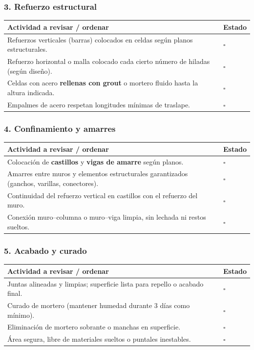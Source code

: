 \documentclass[12pt]{article}
\newcommand{\cbox}{\(\square\)}
\renewcommand{\cbox}{\(\square\)} %
\begin{document}
	\subsubsection*{3. Refuerzo estructural}
	\begin{tabularx}{\linewidth}{>{\raggedright\arraybackslash}p{0.93\linewidth} >{\centering\arraybackslash}m{0.07\linewidth}}
		\toprule
		\textbf{Actividad a revisar / ordenar} & \textbf{Estado}\\
		\midrule
		Refuerzos verticales (barras) colocados en celdas según planos estructurales. & \cbox \\
		Refuerzo horizontal o malla colocado cada cierto número de hiladas (según diseño). & \cbox \\
		Celdas con acero \textbf{rellenas con grout} o mortero fluido hasta la altura indicada. & \cbox \\
		Empalmes de acero respetan longitudes mínimas de traslape. & \cbox \\
		\bottomrule
	\end{tabularx}
	
	\subsubsection*{4. Confinamiento y amarres}
	\begin{tabularx}{\linewidth}{>{\raggedright\arraybackslash}p{0.93\linewidth} >{\centering\arraybackslash}m{0.07\linewidth}}
		\toprule
		\textbf{Actividad a revisar / ordenar} & \textbf{Estado}\\
		\midrule
		Colocación de \textbf{castillos} y \textbf{vigas de amarre} según planos. & \cbox \\
		Amarres entre muros y elementos estructurales garantizados (ganchos, varillas, conectores). & \cbox \\
		Continuidad del refuerzo vertical en castillos con el refuerzo del muro. & \cbox \\
		Conexión muro–columna o muro–viga limpia, sin lechada ni restos sueltos. & \cbox \\
		\bottomrule
	\end{tabularx}
	
	\subsubsection*{5. Acabado y curado}
	\begin{tabularx}{\linewidth}{>{\raggedright\arraybackslash}p{0.93\linewidth} >{\centering\arraybackslash}m{0.07\linewidth}}
		\toprule
		\textbf{Actividad a revisar / ordenar} & \textbf{Estado}\\
		\midrule
		Juntas alineadas y limpias; superficie lista para repello o acabado final. & \cbox \\
		Curado de mortero (mantener humedad durante 3 días como mínimo). & \cbox \\
		Eliminación de mortero sobrante o manchas en superficie. & \cbox \\
		Área segura, libre de materiales sueltos o puntales inestables. & \cbox \\
		\bottomrule
	\end{tabularx}
	
\end{document}
